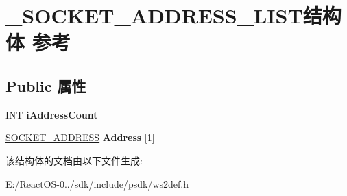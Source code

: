 \hypertarget{struct___s_o_c_k_e_t___a_d_d_r_e_s_s___l_i_s_t}{}\section{\+\_\+\+S\+O\+C\+K\+E\+T\+\_\+\+A\+D\+D\+R\+E\+S\+S\+\_\+\+L\+I\+S\+T结构体 参考}
\label{struct___s_o_c_k_e_t___a_d_d_r_e_s_s___l_i_s_t}
\subsection*{Public 属性}
\begin{DoxyCompactItemize}
\item 
\mbox{\label{struct___s_o_c_k_e_t___a_d_d_r_e_s_s___l_i_s_t_a47a577d9202bcf40953c813a49895c80}} 
I\+NT {\bfseries i\+Address\+Count}
\item 
\mbox{\label{struct___s_o_c_k_e_t___a_d_d_r_e_s_s___l_i_s_t_a27e7cfd0ac0e829d7a38c83e73702b8b}} 
\hyperlink{struct___s_o_c_k_e_t___a_d_d_r_e_s_s}{S\+O\+C\+K\+E\+T\+\_\+\+A\+D\+D\+R\+E\+SS} {\bfseries Address} \mbox{[}1\mbox{]}
\end{DoxyCompactItemize}


该结构体的文档由以下文件生成\+:\begin{DoxyCompactItemize}
\item 
E\+:/\+React\+O\+S-\/0../sdk/include/psdk/ws2def.\+h\end{DoxyCompactItemize}
